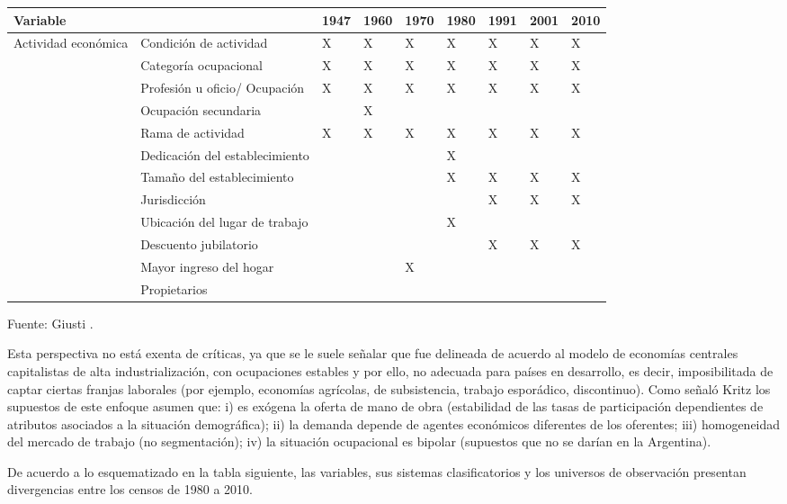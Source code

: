 \documentclass[
]{book}
\begin{document}
\begin{longtable}[]{@{}lllllllll@{}}
\toprule
Variable & & 1947 & 1960 & 1970 & 1980 & 1991 & 2001 & 2010\tabularnewline
\midrule
\endhead
Actividad económica & Condición de actividad & X & X & X & X & X & X & X\tabularnewline
& Categoría ocupacional & X & X & X & X & X & X & X\tabularnewline
& Profesión u oficio/ Ocupación & X & X & X & X & X & X & X\tabularnewline
& Ocupación secundaria & & X & & & & &\tabularnewline
& Rama de actividad & X & X & X & X & X & X & X\tabularnewline
& Dedicación del establecimiento & & & & X & & &\tabularnewline
& Tamaño del establecimiento & & & & X & X & X & X\tabularnewline
& Jurisdicción & & & & & X & X & X\tabularnewline
& Ubicación del lugar de trabajo & & & & X & & &\tabularnewline
& Descuento jubilatorio & & & & & X & X & X\tabularnewline
& Mayor ingreso del hogar & & & X & & & &\tabularnewline
& Propietarios & & & & & & &\tabularnewline
\bottomrule
\end{longtable}

Fuente: Giusti \citeyearpar[p.~224]{Giusti2007}.

Esta perspectiva no está exenta de críticas, ya que se le suele señalar que fue delineada de acuerdo al modelo de economías centrales capitalistas de alta industrialización, con ocupaciones estables y por ello, no adecuada para países en desarrollo, es decir, imposibilitada de captar ciertas franjas laborales (por ejemplo, economías agrícolas, de subsistencia, trabajo esporádico, discontinuo). Como señaló Kritz \citeyearpar{Kritz1987} los supuestos de este enfoque asumen que: i) es exógena la oferta de mano de obra (estabilidad de las tasas de participación dependientes de atributos asociados a la situación demográfica); ii) la demanda depende de agentes económicos diferentes de los oferentes; iii) homogeneidad del mercado de trabajo (no segmentación); iv) la situación ocupacional es bipolar (supuestos que no se darían en la Argentina).

De acuerdo a lo esquematizado en la tabla siguiente, las variables, sus sistemas clasificatorios y los universos de observación presentan divergencias entre los censos de 1980 a 2010.
\end{document}
